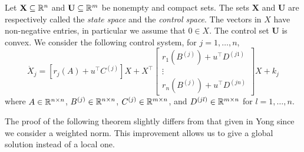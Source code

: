Let $\mathbf{X}\subseteq\mathbb{R}^n$ and $\mathbf{U}\subseteq \mathbb{R}^m$ be nonempty and compact sets. The sets $\mathbf{X}$ and $\mathbf{U}$ are 
respectively called the {\it state space} and the {\it control space}. The vectors in $X$ have non-negative entries, in particular we assume that $0\in X$. The control set $\mathbf{U}$ is convex. We consider the following control system, for $j=1,\ldots,n$, 
\begin{equation}\label{FamilyControlSystem}
    \dot{X}_j  =  [r_j(A) + u^\top C^{(j)}]X +
    X^\top    \begin{bmatrix}
    r_1(B^{(j)}) + u^\top D^{(j1)}\\
    \vdots \\
    r_n(B^{(j)}) + u^\top D^{(jn)}
  \end{bmatrix}  X + k_j
\end{equation}
where $A\in\mathbb{R}^{n\times n}$, $B^{(j)}\in\mathbb{R}^{n\times n}$, $C^{(j)}\in\mathbb{R}^{m\times n}$, and $ D^{(jl)}\in\mathbb{R}^{m\times n}$ for $l=1,\ldots,n$.






The proof of the following theorem slightly differs from that given in Yong \cite[Sect. 2.1]{Yong2015} since we consider a weighted norm. This improvement allows us to give a global solution instead of a local one. 


